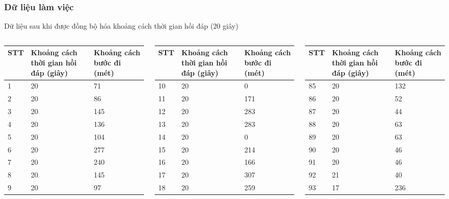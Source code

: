\documentclass[t]{beamer}
\begin{document}

\begin{frame}[t]
\frametitle{Dữ liệu làm việc}Dữ liệu sau khi được đồng bộ hóa khoảng cách thời gian hồi đáp (20 giây)\\
\begin{columns}[T] %
\begin{column}{.3\textwidth}
\begin{tabular}{ |l|p{1cm}|p{1cm}| }
\hline
STT&Khoảng cách thời gian hồi đáp (giây) & Khoảng cách bước đi (mét)\\
\hline
\hline
1&20&71\\
\hline
2&20& 86\\
\hline
3&20& 145\\
\hline
4&20& 136\\
\hline
5&20& 104\\
\hline
6&20& 277\\
\hline
7&20& 240\\
\hline
8&20& 145\\
\hline
9&20& 97\\
\hline
\end{tabular}
\end{column}%
\hfill%
\begin{column}{.3\textwidth}
\begin{tabular}{ |l|p{1cm}|p{1cm}| }
\hline
STT&Khoảng cách thời gian hồi đáp (giây) & Khoảng cách bước đi (mét)\\
\hline
\hline
10&20& 0\\
\hline
11&20& 171\\
\hline
12&20& 283\\
\hline
13&20& 283\\
\hline
14&20& 0\\
\hline
15&20& 214\\
\hline
16&20& 166\\
\hline
17&20& 307\\
\hline
18&20& 259\\
\hline
\end{tabular}
\end{column}%
\hfill%
\begin{column}{.3\textwidth}
\begin{tabular}{ |l|p{1cm}|p{1cm}| }
\hline
STT&Khoảng cách thời gian hồi đáp (giây) & Khoảng cách bước đi (mét)\\
\hline
\hline
85&20& 132\\
\hline
86&20& 52\\
\hline
87&20& 44\\
\hline
88&20& 63\\
\hline
89&20& 63\\
\hline
90&20& 46\\
\hline
91&20& 46\\
\hline
92&21& 40\\
\hline
93&17& 236\\
\hline
\end{tabular}
\end{column}%
\end{columns}
\end{frame}
\end{document}
